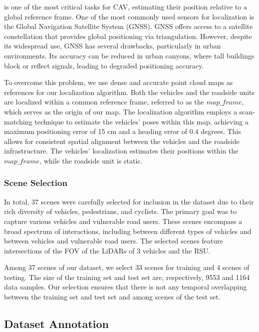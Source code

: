 is one of the most critical tasks for CAV, estimating their position relative to a global reference frame. 
One of the most commonly used sensors for localization is the Global Navigation Satellite System (GNSS). GNSS offers access to a satellite constellation that provides global positioning via triangulation. However, despite its widespread use, GNSS has several drawbacks, particularly in urban environments. Its accuracy can be reduced in urban canyons, where tall buildings block or reflect signals, leading to degraded positioning accuracy. 

To overcome this problem, we use dense and accurate point cloud maps \cite{liosam2020shan} as references for our localization algorithm. Both the vehicles and the roadside units are localized within a common reference frame, referred to as the $map\_frame$, which serves as the origin of our map. The localization algorithm employs a scan-matching technique \cite{ndt} to estimate the vehicles' poses within this map, achieving a maximum positioning error of 15 cm and a heading error of 0.4 degrees.
This allows for consistent spatial alignment between the vehicles and the roadside infrastructure. The vehicles' localization estimates their positions within the $map\_frame$, while the roadside unit is static.


\subsubsection{Scene Selection}

In total, 37 scenes were carefully selected for inclusion in the dataset due to their rich diversity of vehicles, pedestrians, and cyclists. The primary goal was to capture various vehicles and vulnerable road users. These scenes encompass a broad spectrum of interactions, including between different types of vehicles and between vehicles and vulnerable road users.
The selected scenes feature intersections of the FOV of the LiDARs of 3 vehicles and the RSU.

Among 37 scenes of our dataset, we select 33 scenes for training and 4 scenes of testing.
The size of the training set and test set are, respectively, 9553 and 1164 data samples.
Our selection ensures that there is not any temporal overlapping between the training set and test set and among scenes of the test set.


\subsection{Dataset Annotation}

